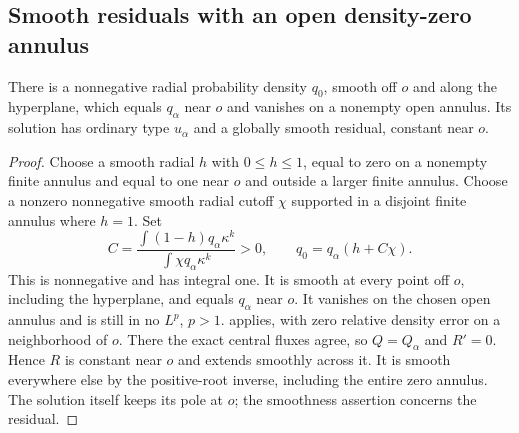 \subsection{Smooth residuals with an open density-zero annulus}
\begin{proposition}\label{prop:radial-zero-annulus}
There is a nonnegative radial
probability density $q_0$, smooth off $o$ and along the hyperplane,
which equals $q_\alpha$ near $o$ and vanishes on a nonempty open
annulus. Its solution has ordinary type $u_\alpha$ and a
globally smooth residual, constant near $o$.
\end{proposition}
\begin{proof}
Choose a smooth radial $h$ with $0\le h\le1$, equal to zero on
a nonempty finite annulus and equal to one near $o$ and outside
a larger finite annulus. Choose a nonzero nonnegative smooth radial
cutoff $\chi$ supported in a disjoint finite annulus where $h=1$.
Set
\[
 C=\frac{\int(1-h)q_\alpha\kappa^k}{\int\chi q_\alpha\kappa^k}>0,
 \qquad q_0=q_\alpha(h+C\chi).
\]
This is nonnegative and has integral one. It is smooth at every
point off $o$, including the hyperplane, and equals $q_\alpha$
near $o$. It vanishes on the chosen open annulus and is still in
no $L^p$, $p>1$.  applies, with
zero relative density error on a neighborhood of $o$. There the
exact central fluxes agree, so $Q=Q_\alpha$ and $R'=0$.
Hence $R$ is constant near $o$ and extends smoothly across it.
It is smooth everywhere else by the positive-root inverse, including
the entire zero annulus. The solution itself keeps its pole at $o$;
the smoothness assertion concerns the residual.
\end{proof}

